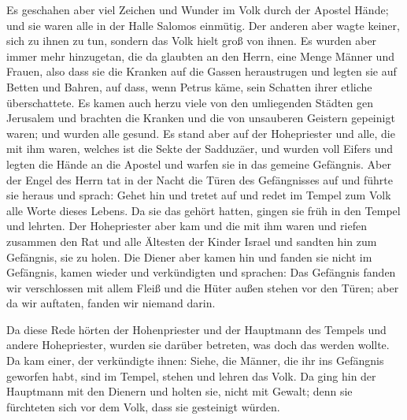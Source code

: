 Es geschahen aber viel Zeichen und Wunder im Volk durch
der Apostel Hände; und sie waren alle in der Halle Salomos einmütig.
 Der anderen aber wagte keiner, sich zu ihnen zu tun,
sondern das Volk hielt groß von ihnen.  Es wurden aber
immer mehr hinzugetan, die da glaubten an den Herrn, eine Menge Männer
und Frauen,  also dass sie die Kranken auf die Gassen
heraustrugen und legten sie auf Betten und Bahren, auf dass, wenn Petrus
käme, sein Schatten ihrer etliche überschattete.  Es
kamen auch herzu viele von den umliegenden Städten gen Jerusalem und
brachten die Kranken und die von unsauberen Geistern gepeinigt waren;
und wurden alle gesund.  Es stand aber auf der
Hohepriester und alle, die mit ihm waren, welches ist die Sekte der
Sadduzäer, und wurden voll Eifers  und legten die Hände
an die Apostel und warfen sie in das gemeine Gefängnis. 
Aber der Engel des Herrn tat in der Nacht die Türen des Gefängnisses auf
und führte sie heraus und sprach:  Gehet hin und tretet
auf und redet im Tempel zum Volk alle Worte dieses Lebens.
 Da sie das gehört hatten, gingen sie früh in den Tempel
und lehrten. Der Hohepriester aber kam und die mit ihm waren und riefen
zusammen den Rat und alle Ältesten der Kinder Israel und sandten hin zum
Gefängnis, sie zu holen.  Die Diener aber kamen hin und
fanden sie nicht im Gefängnis, kamen wieder und verkündigten
 und sprachen: Das Gefängnis fanden wir verschlossen mit
allem Fleiß und die Hüter außen stehen vor den Türen; aber da wir
auftaten, fanden wir niemand darin.

 Da diese Rede hörten der Hohenpriester und der Hauptmann
des Tempels und andere Hohepriester, wurden sie darüber betreten, was
doch das werden wollte.  Da kam einer, der verkündigte
ihnen: Siehe, die Männer, die ihr ins Gefängnis geworfen habt, sind im
Tempel, stehen und lehren das Volk.  Da ging hin der
Hauptmann mit den Dienern und holten sie, nicht mit Gewalt; denn sie
fürchteten sich vor dem Volk, dass sie gesteinigt würden.

